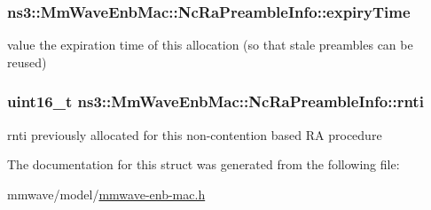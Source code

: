 \subsubsection[{\texorpdfstring{expiry\+Time}{expiryTime}}]{ ns3\+::\+Mm\+Wave\+Enb\+Mac\+::\+Nc\+Ra\+Preamble\+Info\+::expiry\+Time}\hypertarget{structns3_1_1MmWaveEnbMac_1_1NcRaPreambleInfo_a2794a7435490c296f60006f83e690fa4}{}\label{structns3_1_1MmWaveEnbMac_1_1NcRaPreambleInfo_a2794a7435490c296f60006f83e690fa4}


value the expiration time of this allocation (so that stale preambles can be reused) 

\subsubsection[{\texorpdfstring{rnti}{rnti}}]{\setlength{\rightskip}{0pt plus 5cm}uint16\+\_\+t ns3\+::\+Mm\+Wave\+Enb\+Mac\+::\+Nc\+Ra\+Preamble\+Info\+::rnti}\hypertarget{structns3_1_1MmWaveEnbMac_1_1NcRaPreambleInfo_a7dfb57ed2aefe13ffc1753a4609b4150}{}\label{structns3_1_1MmWaveEnbMac_1_1NcRaPreambleInfo_a7dfb57ed2aefe13ffc1753a4609b4150}


rnti previously allocated for this non-\/contention based RA procedure 



The documentation for this struct was generated from the following file\+:\begin{DoxyCompactItemize}
\item 
mmwave/model/\hyperlink{mmwave-enb-mac_8h}{mmwave-\/enb-\/mac.\+h}\end{DoxyCompactItemize}
